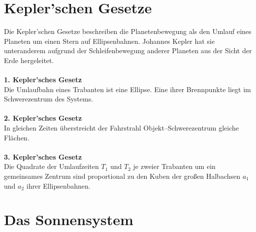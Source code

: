 \documentclass[a4paper,12pt]{article}
\begin{document}
\section{Kepler'schen Gesetze}
Die Kepler'schen Gesetze beschreiben die Planetenbewegung als den Umlauf eines Planeten um einen Stern auf Ellipsenbahnen. Johannes Kepler hat sie unteranderem aufgrund der Schleifenbewegung anderer Planeten aus der Sicht der Erde hergeleitet.
\\\hfill\\\textbf{1. Kepler'sches Gesetz}\\ 
Die Umlaufbahn eines Trabanten ist eine Ellipse. Eine ihrer Brennpunkte liegt im Schwerezentrum des Systems.
\\\hfill\\\textbf{2. Kepler'sches Gesetz}\\ 
In gleichen Zeiten überstreicht der Fahrstrahl Objekt--Schwerezentrum gleiche Flächen.
\\\hfill\\\textbf{3. Kepler'sches Gesetz}\\ 
Die Quadrate der Umlaufzeiten $T_1$ und $T_2$ je zweier Trabanten um ein gemeinsames Zentrum sind proportional zu den Kuben der großen Halbachsen $a_1$ und $a_2$ ihrer Ellipsenbahnen.

\section{Das Sonnensystem}
\end{document}
